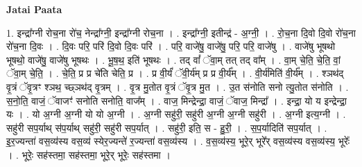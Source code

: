 \documentclass[17pt]{extarticle}
\begin{document}
\textbf{Jatai Paata} \newline

1. इन्द्रा᳚ग्नी रोच॒ना रो॑च॒ नेन्द्रा᳚ग्नी॒ इन्द्रा᳚ग्नी रोच॒ना । . इन्द्रा᳚ग्नी॒ इतीन्द्र॑ - अ॒ग्नी॒ । . रो॒च॒ना दि॒वो दि॒वो रो॑च॒ना रो॑च॒ना दि॒वः । . दि॒वः परि॒ परि॑ दि॒वो दि॒वः परि॑ । . परि॒ वाजे॑षु॒ वाजे॑षु॒ परि॒ परि॒ वाजे॑षु । . वाजे॑षु भूषथो भूषथो॒ वाजे॑षु॒ वाजे॑षु भूषथः । . भू॒ष॒थ॒ इति॑ भूषथः । . तद् वां᳚ ॅवा॒म् तत् तद् वा᳚म् । . वा॒म् चे॒ति॒ चे॒ति॒ वां॒ ॅवा॒म् चे॒ति॒ । . चे॒ति॒ प्र प्र चे॑ति चेति॒ प्र । . प्र वी॒र्यं॑ ॅवी॒र्य॑म् प्र प्र वी॒र्य᳚म् । . वी॒र्य॑मिति॑ वी॒र्य᳚म् । . श्ञथ॑द् वृ॒त्रं ॅवृ॒त्रꣳ श्ञथ॒ च्छ्ञथ॑द् वृ॒त्रम् । . वृ॒त्र मु॒तोत वृ॒त्रं ॅवृ॒त्र मु॒त । . उ॒त स॑नोति सनो त्यु॒तोत स॑नोति । . स॒नो॒ति॒ वाजं॒ ॅवाजꣳ॑ सनोति सनोति॒ वाज᳚म् । . वाज॒ मिन्द्रेन्द्रा॒ वाजं॒ ॅवाज॒ मिन्द्रा᳚ । . इन्द्रा॒ यो य इन्द्रेन्द्रा॒ यः । . यो अ॒ग्नी अ॒ग्नी यो यो अ॒ग्नी । . अ॒ग्नी सहु॑री॒ सहु॑री अ॒ग्नी अ॒ग्नी सहु॑री । . अ॒ग्नी इत्य॒ग्नी । . सहु॑री सप॒र्याथ् स॑प॒र्याथ् सहु॑री॒ सहु॑री सप॒र्यात् । . सहु॑री॒ इति॒ स - हु॒री॒ । . स॒प॒र्यादिति॑ सप॒र्यात् । . इ॒र॒ज्यन्ता॑ वस॒व्य॑स्य वस॒व्य॑ स्येर॒ज्यन्ते॑ र॒ज्यन्ता॑ वस॒व्य॑स्य । . व॒स॒व्य॑स्य॒ भूरे॒र् भूरे᳚र् वस॒व्य॑स्य वस॒व्य॑स्य॒ भूरेः᳚ । . भूरेः॒ सह॑स्तमा॒ सह॑स्तमा॒ भूरे॒र् भूरेः॒ सह॑स्तमा । \newline
\end{document}
